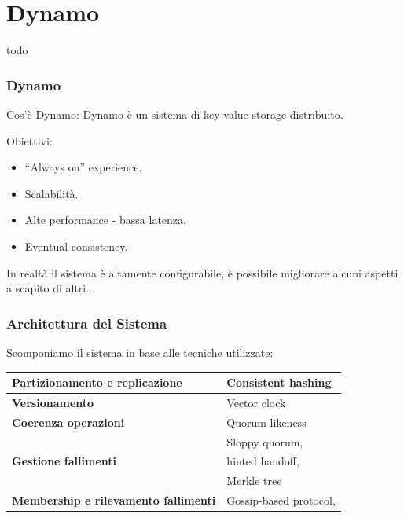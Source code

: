 \section{Dynamo}
\begin{frame}
  todo
\end{frame}


\begin{frame}
  \frametitle{Dynamo}
  \begin{block}{Cos'è Dynamo:}
  Dynamo è un sistema di key-value storage distribuito.
  \end{block}
  \begin{block}{Obiettivi:}      
      \begin{itemize}
      \item ``Always on'' experience.
      \item Scalabilità.
      \item Alte performance - bassa latenza.
      \item Eventual consistency.
      \end{itemize}
  \end{block}
  In realtà il sistema è altamente configurabile, è possibile migliorare alcuni aspetti a scapito di altri...
\end{frame}


\begin{frame}
  \frametitle{Architettura del Sistema}
  Scomponiamo il sistema in base alle tecniche utilizzate:
  \begin{table}[ht]
  \begin{center} 
  \begin{tabular}{| l | l |}
  \hline
  \rowcolor{lightgray} 
  \textbf{Partizionamento e replicazione} & Consistent hashing \\
  \hline
  \textbf{Versionamento}                  & Vector clock \\
  \hline
  \rowcolor{lightgray}
  \textbf{Coerenza operazioni}            & Quorum likeness \\
  \hline
  \multirow{3}{*}{\textbf{Gestione fallimenti}}
                                          & Sloppy quorum, \\
                                          & hinted handoff, \\
                                          & Merkle tree \\ 
  \hline
  \rowcolor{lightgray}
  \textbf{Membership e rilevamento fallimenti}  & Gossip-based protocol, \\ 
  \hline
  \end{tabular}
  \end{center}
  \end{table}
\end{frame}


